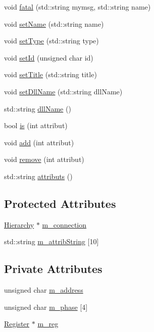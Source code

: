 \begin{DoxyCompactItemize}
\item 
void \hyperlink{classObject_ae62acd3d09f716220f75f252dc38bc9a}{fatal} (std::string mymsg, std::string name)
\item 
void \hyperlink{classObject_ae30fea75683c2d149b6b6d17c09ecd0c}{setName} (std::string name)
\item 
void \hyperlink{classObject_aae534cc9d982bcb9b99fd505f2e103a5}{setType} (std::string type)
\item 
void \hyperlink{classObject_a398fe08cba594a0ce6891d59fe4f159f}{setId} (unsigned char id)
\item 
void \hyperlink{classObject_a89557dbbad5bcaa02652f5d7fa35d20f}{setTitle} (std::string title)
\item 
void \hyperlink{classObject_a870c5af919958c2136623b2d7816d123}{setDllName} (std::string dllName)
\item 
std::string \hyperlink{classObject_a2e3947f2870094c332d7454117f3ec63}{dllName} ()
\item 
bool \hyperlink{classAttrib_a704f26af560909ad22065083bb7d4c34}{is} (int attribut)
\item 
void \hyperlink{classAttrib_a235f773af19c900264a190b00a3b4ad7}{add} (int attribut)
\item 
void \hyperlink{classAttrib_a7d4ef7e32d93cb287792b87b857e79f3}{remove} (int attribut)
\item 
std::string \hyperlink{classAttrib_aee7bbf16b144887f196e1341b24f8a26}{attributs} ()
\end{DoxyCompactItemize}
\subsection*{Protected Attributes}
\begin{DoxyCompactItemize}
\item 
\hyperlink{classHierarchy}{Hierarchy} $\ast$ \hyperlink{classElement_abe3de7a5dbbc9a6dd2d7e012e5fdb266}{m\_\-connection}
\item 
std::string \hyperlink{classAttrib_a3414521d7a82476e874b25a5407b5e63}{m\_\-attribString} \mbox{[}10\mbox{]}
\end{DoxyCompactItemize}
\subsection*{Private Attributes}
\begin{DoxyCompactItemize}
\item 
unsigned char \hyperlink{classPhaser_a8395e4279ce87dc816e02dd684a9fa3a}{m\_\-address}
\item 
unsigned char \hyperlink{classPhaser_a04df9ce4afe7a36ccaba5e5e727d504e}{m\_\-phase} \mbox{[}4\mbox{]}
\item 
\hyperlink{classRegister}{Register} $\ast$ \hyperlink{classPhaser_ab6d751d77cb1e39723a6ac85d4cfec0c}{m\_\-reg}
\end{DoxyCompactItemize}


